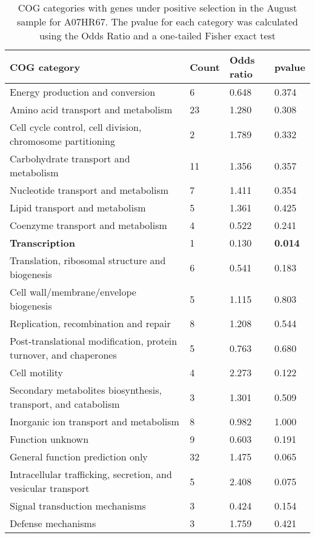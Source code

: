 \begin{table}[hb]
\footnotesize 
	\tabcolsep=0.11cm 
\caption{COG categories with genes under positive selection in the August sample for A07HR67. The pvalue for each category was calculated using the Odds Ratio and a one-tailed Fisher exact test} 
\begin{tabularx}{\textwidth}{L{6cm}R{2cm}R{2cm}R{2cm}} 
\hline 
\textbf{COG category} & \textbf{Count} & \textbf{Odds ratio} & \textbf{pvalue} \\ 
\hline 
Energy production and conversion & 6 & 0.648 & 0.374 \\ 
Amino acid transport and metabolism & 23 & 1.280 & 0.308 \\ 
Cell cycle control, cell division, chromosome partitioning & 2 & 1.789 & 0.332 \\ 
Carbohydrate transport and metabolism & 11 & 1.356 & 0.357 \\ 
Nucleotide transport and metabolism & 7 & 1.411 & 0.354 \\ 
Lipid transport and metabolism & 5 & 1.361 & 0.425 \\ 
Coenzyme transport and metabolism & 4 & 0.522 & 0.241 \\ 
\textbf{Transcription} & 1 & 0.130 & \textbf{0.014} \\ 
Translation, ribosomal structure and biogenesis & 6 & 0.541 & 0.183 \\ 
Cell wall/membrane/envelope biogenesis & 5 & 1.115 & 0.803 \\ 
Replication, recombination and repair & 8 & 1.208 & 0.544 \\ 
Post-translational modification, protein turnover, and chaperones & 5 & 0.763 & 0.680 \\ 
Cell motility & 4 & 2.273 & 0.122 \\ 
Secondary metabolites biosynthesis, transport, and catabolism & 3 & 1.301 & 0.509 \\ 
Inorganic ion transport and metabolism & 8 & 0.982 & 1.000 \\ 
Function unknown & 9 & 0.603 & 0.191 \\ 
General function prediction only & 32 & 1.475 & 0.065 \\ 
Intracellular trafficking, secretion, and vesicular transport & 5 & 2.408 & 0.075 \\ 
Signal transduction mechanisms & 3 & 0.424 & 0.154 \\ 
Defense mechanisms & 3 & 1.759 & 0.421 \\ 
\end{tabularx} 
\label{August_COG_Selection_A07HR67} 
 \end{table} 

